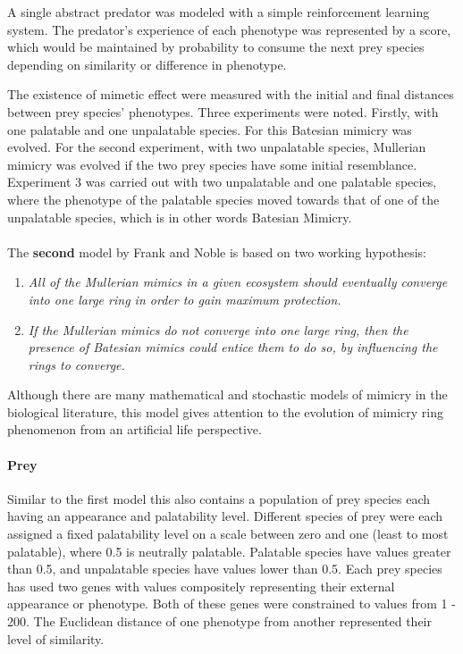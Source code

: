 A single abstract predator was modeled with a simple reinforcement learning system. The predator's experience of each phenotype was represented by a score, which would be maintained by probability to consume the next prey species depending on similarity or difference in phenotype. 

The existence of mimetic effect were measured with the initial and final distances between prey species' phenotypes. Three experiments were noted. Firstly, with one palatable and one unpalatable species. For this Batesian mimicry was evolved. For the second experiment, with two unpalatable species, Mullerian mimicry was evolved if the two prey species have some initial resemblance. Experiment 3 was carried out with two unpalatable and one palatable species, where the phenotype of the palatable species moved towards that of one of the unpalatable species, which is in other words Batesian Mimicry.

\paragraph{}
The \textbf{second} model by Frank and Noble \cite{franks2003} is based on two working hypothesis:

\begin{enumerate}
	\item \textsl{All of the Mullerian mimics in a given ecosystem should eventually converge into one large ring in order to gain maximum protection.}
	\item \textsl{If the Mullerian mimics do not converge into one large ring, then the presence of Batesian mimics could entice them to do so, by influencing the rings to converge.}
\end{enumerate}

Although there are many mathematical and stochastic models of mimicry in the biological literature, this model gives attention to the evolution of mimicry ring phenomenon from an artificial life perspective.

\paragraph{Prey}
Similar to the first model this also contains a population of prey species each having an appearance and palatability level. Different species of prey were each assigned a fixed palatability level on a scale between zero and one (least to most palatable), where 0.5 is neutrally palatable. Palatable species have values greater than 0.5, and unpalatable species have values lower than 0.5. Each prey species has used two genes with values compositely representing their external appearance or phenotype. Both of these genes were constrained to values from 1 - 200. The Euclidean distance of one phenotype from another represented their level of similarity.


